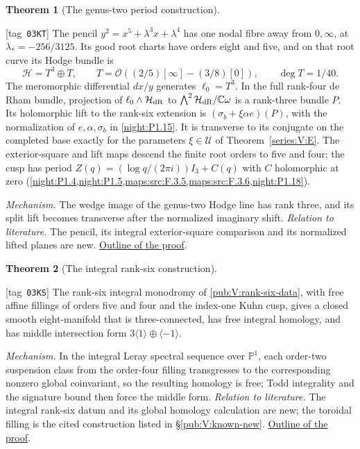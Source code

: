 \documentclass[11pt,a4paper]{article}
\numberwithin{equation}{section}
\theoremstyle{definition}
\newcommand{\OO}{\mathcal O}\newcommand{\cO}{\mathcal O}\newcommand{\cM}{\mathcal M}\newcommand{\cF}{\mathcal F}
\newtheorem{maintheorem}{Theorem}
\newcommand{\StatementRecord}[4]{{\upshape\footnotesize[tag~\texttt{#3}]}\enspace\ignorespaces}
\begin{document}
\hypertarget{main-V-C}{}
\begin{maintheorem}[The genus-two period construction]
\hypertarget{tag-03KT}{}\label{series:V:C}
\StatementRecord{series:V:C}{proved}{03KT}{\cref{night:P1.4}, \cref{night:P1.5}, \cref{maps:src:F.3.5}, \cref{maps:src:F.3.6}, \cref{night:P1.18}}
The pencil $y^2=x^5+\lambda^3x+\lambda^4$ has one nodal
fibre away from $0,\infty$, at $\lambda_*=-256/3125$.
Its good root charts have orders eight and five, and on that root
curve its Hodge bundle is
\[
 \mathcal H=T^3\oplus T,\qquad
 T=\OO((2/5)[\infty]-(3/8)[0]),\qquad \deg T=1/40.
\]
The meromorphic differential $dx/y$ generates $\ell_0=T^3$.
In the full rank-four de Rham bundle, projection of
$\ell_0\wedge\mathcal H_{\rm dR}$ to
$\bigwedge^2\mathcal H_{\rm dR}/\mathbb C\omega$
is a rank-three bundle $P$.  Its holomorphic lift to the rank-six extension is $(\sigma_b+\xi\alpha e)(P)$, with the
normalization of $e,\alpha,\sigma_b$ in \cref{night:P1.15}.
It is transverse to its conjugate on the completed base exactly
for the parameters $\xi\in\mathcal U$ of Theorem~\ref{series:V:E}.
The exterior-square and lift maps descend the finite root
orders to five and four; the cusp has period
$Z(q)=(\log q/(2\pi i))I_3+C(q)$ with $C$ holomorphic at zero
(\cref{night:P1.4,night:P1.5,maps:src:F.3.5,maps:src:F.3.6,night:P1.18}).

\end{maintheorem}

\textit{Mechanism.} The wedge image of the genus-two Hodge line has rank three, and its split lift becomes transverse after the normalized imaginary shift.
\textit{Relation to literature.} The pencil, its integral exterior-square comparison and its normalized lifted planes are new.
\hyperlink{outline-V-C}{Outline of the proof}.

\hypertarget{main-V-B}{}
\begin{maintheorem}[The integral rank-six construction]
\hypertarget{tag-03KS}{}\label{series:V:B}
\StatementRecord{series:V:B}{proved}{03KS}{\cref{maps:src:F.2.5}, \cref{maps:src:F.2.6}, \cref{night:P1.13}}
The rank-six integral monodromy of \cref{pub:V:rank-six-data}, with free affine fillings of orders five and four and the index-one Kuhn cusp, gives a closed smooth eight-manifold that is three-connected, has free integral homology, and has middle intersection form $3\langle1\rangle\oplus\langle-1\rangle$.

\end{maintheorem}

\textit{Mechanism.} In the integral Leray spectral sequence over $\mathbb P^1$, each order-two suspension class from the order-four filling transgresses to the corresponding nonzero global coinvariant, so the resulting homology is free; Todd integrality and the signature bound then force the middle form.
\textit{Relation to literature.} The integral rank-six datum and its global homology calculation are new; the toroidal filling is the cited construction listed in \S\ref{pub:V:known-new}.
\hyperlink{outline-V-B}{Outline of the proof}.
\end{document}
